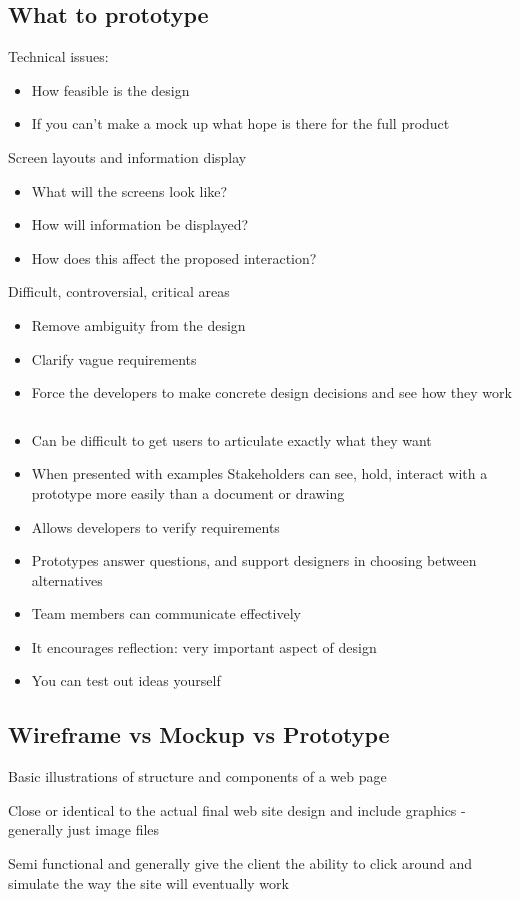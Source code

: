 \documentclass{article}[18pt]
\begin{document}
\subsection{What to prototype}
Technical issues:
\begin{itemize}
	\item How feasible is the design
	\item If you can't make a mock up what hope is there for the full product
\end{itemize}
Screen layouts and information display
\begin{itemize}
	\item What will the screens look like?
	\item How will information be displayed?
	\item How does this affect the proposed interaction?
\end{itemize}
Difficult, controversial, critical areas
\begin{itemize}
	\item Remove ambiguity from the design
	\item Clarify vague requirements
	\item Force the developers to make concrete design decisions and see how they work
\end{itemize}
$ $
\begin{itemize}
	\item Can be difficult to get users to articulate exactly what they want
	\item When presented with examples Stakeholders can see, hold, interact with a prototype more easily than a document or drawing
	\item Allows developers to verify requirements
	\item Prototypes answer questions, and support designers in choosing between alternatives
	\item Team members can communicate effectively
	\item It encourages reflection: very important aspect of design
	\item You can test out ideas yourself
\end{itemize}
\subsection{Wireframe vs Mockup vs Prototype}
\begin{defin}[Wireframe]
Basic illustrations of structure and components of a web page
\end{defin}
\begin{defin}[Mockups]
Close or identical to the actual final web site design and include graphics - generally just image files
\end{defin}
\begin{defin}[Prototypes]
Semi functional and generally give the client the ability to click around and simulate the way the site will eventually work
\end{defin}
\end{document}
